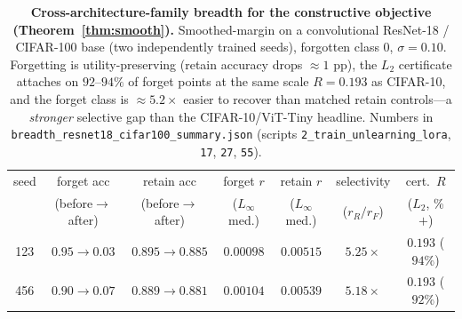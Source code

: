 \documentclass{article}
\begin{document}
\begin{table}[t]
  \centering
  \small
  \setlength{\tabcolsep}{5pt}
  \begin{tabular}{c c c c c c c}
    \toprule
    seed & forget acc & retain acc & forget $r$ & retain $r$ & selectivity & cert.\ $R$ \\
     & (before$\to$after) & (before$\to$after) & ($L_\infty$ med.) & ($L_\infty$ med.) & ($r_R/r_F$) & ($L_2$, \%${+}$) \\
    \midrule
    123 & $0.95\to0.03$ & $0.895\to0.885$ & $0.00098$ & $0.00515$ & $5.25\times$ & $0.193$ ($94\%$) \\
    456 & $0.90\to0.07$ & $0.889\to0.881$ & $0.00104$ & $0.00539$ & $5.18\times$ & $0.193$ ($92\%$) \\
    \bottomrule
  \end{tabular}
  \caption{\textbf{Cross-architecture-family breadth for the constructive
  objective (Theorem~\ref{thm:smooth}).} Smoothed-margin on a convolutional
  ResNet-18 / CIFAR-100 base (two independently trained seeds), forgotten class
  $0$, $\sigma=0.10$. Forgetting is utility-preserving (retain accuracy drops
  $\approx\!1$ pp), the $L_2$ certificate attaches on $92$--$94\%$ of forget
  points at the same scale $R=0.193$ as CIFAR-10, and the forget class is
  $\approx\!5.2\times$ easier to recover than matched retain controls---a
  \emph{stronger} selective gap than the CIFAR-10/ViT-Tiny headline. Numbers in
  \texttt{breadth\_resnet18\_cifar100\_summary.json} (scripts
  \texttt{2\_train\_unlearning\_lora}, \texttt{17}, \texttt{27}, \texttt{55}).}
  \label{tab:breadth}
\end{table}
\end{document}
